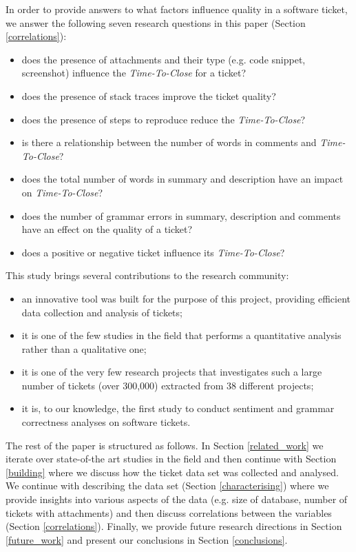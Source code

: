 \documentclass{mpaper}
\begin{document}
In order to provide answers to what factors influence quality in a software ticket, we answer the following seven research 
questions in this paper (Section \ref{correlations}):
\begin{itemize}
  \item does the presence of attachments and their type (e.g. code snippet, screenshot) influence the \emph{Time-To-Close} for 
  a ticket?
  \item does the presence of stack traces improve the ticket quality?
  \item does the presence of steps to reproduce reduce the \emph{Time-To-Close}?
  \item is there a relationship between the number of words in comments and \emph{Time-To-Close}?
  \item does the total number of words in summary and description have an impact on \emph{Time-To-Close}?
  \item does the number of grammar errors in summary, description and comments have an effect on the quality of a ticket?
  \item does a positive or negative ticket influence its \emph{Time-To-Close}?
\end{itemize}

This study brings several contributions to the research community:
\begin{itemize}
  \item an innovative tool was built for the purpose of this project, providing efficient data collection and analysis of
  tickets;
  \item it is one of the few studies in the field that performs a quantitative analysis rather than a qualitative one;
  \item it is one of the very few research projects that investigates such a large number of tickets (over 300,000)
  extracted from 38 different projects;
  \item it is, to our knowledge, the first study to conduct sentiment and grammar correctness analyses on software tickets.
\end{itemize}

The rest of the paper is structured as follows. In Section \ref{related_work} we iterate over state-of-the art studies in 
the field and then continue with Section \ref{building} where we discuss how the ticket data set was collected and 
analysed. We continue with describing the data set (Section \ref{characterising}) where we provide insights into various 
aspects of the data (e.g. size of database, number of tickets with attachments) and then discuss correlations between 
the variables (Section \ref{correlations}). Finally, we provide future research directions in Section \ref{future_work} 
and present our conclusions in Section \ref{conclusions}.
\end{document}
